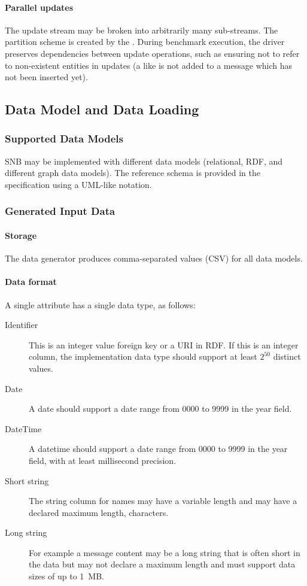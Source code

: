 \paragraph{Parallel updates}
The update stream may be broken into arbitrarily many sub-streams. The partition scheme is created by the \datagen. During benchmark execution, the driver preserves dependencies between update operations, such as ensuring not to refer to non-existent entities in updates (\eg a like is not added to a message which has not been inserted yet).

\subsection{Data Model and Data Loading}

\subsubsection{Supported Data Models}

SNB may be implemented with different data models (\eg relational, RDF, and different graph data models). The reference schema is provided in the specification using a UML-like notation. 


\subsubsection{Generated Input Data}
\label{sec:generated-data}

\paragraph{Storage}
The data generator produces comma-separated values (CSV) for all data models.

\paragraph{Data format}
A single attribute has a single data type, as follows:
\begin{description}
    \item [Identifier] This is an integer value foreign key or a URI in RDF. If this is an integer column, the implementation data type should support at least $2^{50}$ distinct values.
    \item [Date] A date should support a date range from 0000 to 9999 in the year field.
    \item [DateTime] A datetime should support a date range from 0000 to 9999 in the year field, with at least millisecond precision.
    \item [Short string] The string column for names may have a variable length and may have a declared maximum length,  characters.
    \item [Long string] For example a message content may be a long string that is often short in the data but may not declare a maximum length and must support data sizes of up to 1~MB.
\end{description}

